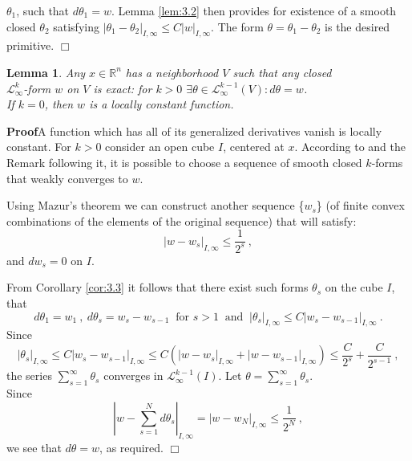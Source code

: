 \documentclass{amsart}%
\newtheorem{cor}[thm]{Corollary}
\newtheorem{lem}[thm]{Lemma}
\begin{document}
$\theta_1$, such that $d\theta_1=w$. Lemma \ref{lem:3.2} then
provides for existence of a smooth closed $\theta_2$ satisfying
$|\theta_1-\theta_2|_{I,\infty}\leq C|w|_{I,\infty}$. The form
$\theta=\theta_1-\theta_2$ is the desired primitive. $\Box$
\begin{lem}%
\label{lem:3.4} Any $x \in \mathbb{R}^{n}$ has a neighborhood $V$
such that any closed\\ $\mathcal{L}^{k}_{\infty}$-form $w$ on $V$
is exact: for $k>0$ $\exists \theta \in
\mathcal{L}^{k-1}_{\infty}(V): d\theta=w$. \\If $k=0$, then $w$ is
a locally constant function.
\end{lem}
{\bf Proof}\quad A function which has all of its generalized
derivatives vanish is locally constant. For $k>0$ consider an open
cube $I$, centered at $x$. According to \cite[Lemma 1.3]{GKS} and
the Remark following it, it is possible to choose a sequence of
smooth closed $k$-forms that weakly converges to $w$.

Using Mazur's theorem \cite[Theorem V.1.2]{Y} we can construct
another sequence \{$w_s$\} (of finite convex combinations of the
elements of the original sequence) that will satisfy:
$$|w-w_s|_{I,\infty}\leq \frac{1}{2^s}\ ,$$ and $dw_s=0$ on $I$.

From Corollary \ref{cor:3.3} it follows that there exist such
forms $\theta_s$ on the cube $I$, that
$$
d\theta_1=w_1\ ,\ d\theta_s=w_s-w_{s-1}\ \textrm{ for }s>1\
\textrm{ and }\ |\theta_s|_{I,\infty}\leq
C|w_s-w_{s-1}|_{I,\infty}\ .
$$
Since $$|\theta_s|_{I,\infty} \leq C|w_s-w_{s-1}|_{I,\infty} \leq
C(|w-w_{s}|_{I,\infty}+|w-w_{s-1}|_{I,\infty})\leq
\frac{C}{2^s}+\frac{C}{2^{s-1}}\ ,$$ the series
$\displaystyle{\sum_{s=1}^{\infty}\theta_s}$ converges in
$\mathcal{L}^{k-1}_{\infty}(I)$. Let
$\theta=\displaystyle{\sum_{s=1}^{\infty}\theta_s}$. \\Since
$$|w-\sum_{s=1}^{N}d\theta_s|_{I,\infty}=|w-w_{N}|_{I,\infty}\leq \frac{1}{2^N}\ ,
$$
we see that $d\theta=w$, as required. $\Box$\\
\end{document}
